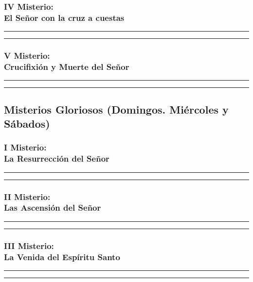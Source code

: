 \documentclass[11pt,a4paper]{report}
\begin{document}
    \subsubsection*{IV Misterio:\\ El Señor con la cruz a cuestas}
    
    
    \rule{\textwidth}{0.5pt}
    
    \rule{\textwidth}{0.5pt}
    

    \subsubsection*{V Misterio:\\ Crucifixión y Muerte del Señor}
    
    
    \rule{\textwidth}{0.5pt}
    
    \rule{\textwidth}{0.5pt}
    

    

    \subsection*{Misterios Gloriosos (Domingos. Miércoles y Sábados)}

    \subsubsection*{I Misterio:\\ La Resurrección del Señor}
    
    
    \rule{\textwidth}{0.5pt}
    
    \rule{\textwidth}{0.5pt}
    

    \subsubsection*{II Misterio:\\ Las Ascensión del Señor}
    
    
    \rule{\textwidth}{0.5pt}
    
    \rule{\textwidth}{0.5pt}
    

    \subsubsection*{III Misterio:\\ La Venida del Espíritu Santo}
    
    
    \rule{\textwidth}{0.5pt}
    
    \rule{\textwidth}{0.5pt}
    
\end{document}
